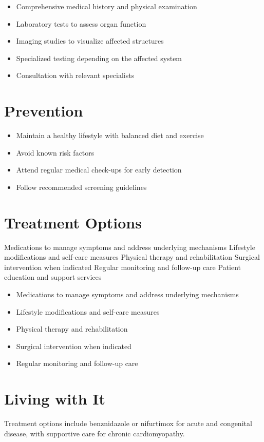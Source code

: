 \begin{itemize}[noitemsep]
  \item Comprehensive medical history and physical examination
  \item Laboratory tests to assess organ function
  \item Imaging studies to visualize affected structures
  \item Specialized testing depending on the affected system
  \item Consultation with relevant specialists
\end{itemize}
\section{Prevention}
\begin{itemize}[noitemsep]
  \item Maintain a healthy lifestyle with balanced diet and exercise
  \item Avoid known risk factors
  \item Attend regular medical check-ups for early detection
  \item Follow recommended screening guidelines
\end{itemize}
\section{Treatment Options}
Medications to manage symptoms and address underlying mechanisms Lifestyle modifications and self-care measures Physical therapy and rehabilitation Surgical intervention when indicated Regular monitoring and follow-up care Patient education and support services

\begin{itemize}[noitemsep]
  \item Medications to manage symptoms and address underlying mechanisms
  \item Lifestyle modifications and self-care measures
  \item Physical therapy and rehabilitation
  \item Surgical intervention when indicated
  \item Regular monitoring and follow-up care
\end{itemize}
\section{Living with It}
Treatment options include benznidazole or nifurtimox for acute and congenital disease, with supportive care for chronic cardiomyopathy.

